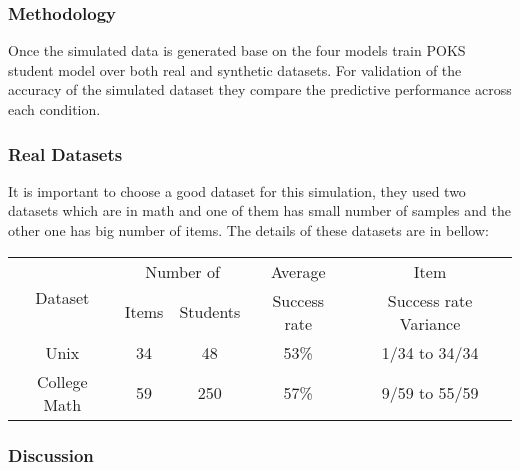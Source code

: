\subsubsection{Methodology}
Once the simulated data is generated base on the four models \citet{Desmarais2010} train POKS student model over both real and synthetic datasets. For validation of the accuracy of the simulated dataset they compare the predictive performance across each condition. 

\subsubsection{Real Datasets}
It is important to choose a good dataset for this simulation, they used two datasets which are in math and one of them has small number of samples and the other one has big number of items. The details of these datasets are in bellow:

\begin{center}

\begin{tabular}{|c|c|c|c|c|}
\hline 
\multirow{2}{*}{Dataset} & \multicolumn{2}{c|}{Number of} & Average & Item\tabularnewline
\cline{2-3} 
 & Items & Students & Success rate & Success rate Variance\tabularnewline
\hline 
Unix & 34 & 48 & 53\% & 1/34 to 34/34\tabularnewline
\hline 
College Math & 59 & 250 & 57\% & 9/59 to 55/59\tabularnewline
\hline 
\end{tabular}

\end{center}

\subsubsection{Discussion}

